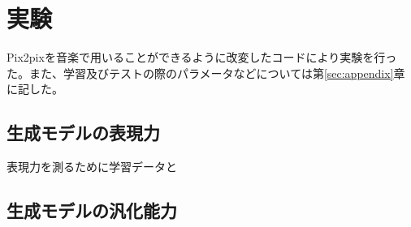 \section{実験}

Pix2pixを音楽で用いることができるように改変したコードにより実験を行った。また、学習及びテストの際のパラメータなどについては第\ref{sec:appendix}章に記した。

\subsection{生成モデルの表現力}

表現力を測るために学習データと


\subsection{生成モデルの汎化能力}


